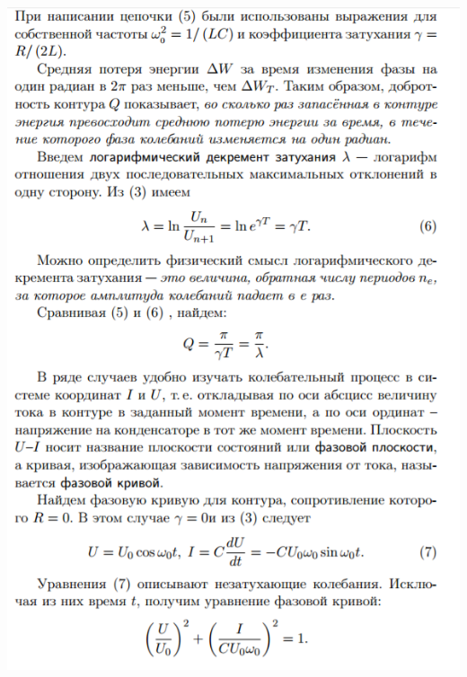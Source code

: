 \documentclass[12pt]{article}
\begin{document}
\begin{center}
        \includegraphics[width=15cm]{theory6.png}

\end{center}
\end{document}
